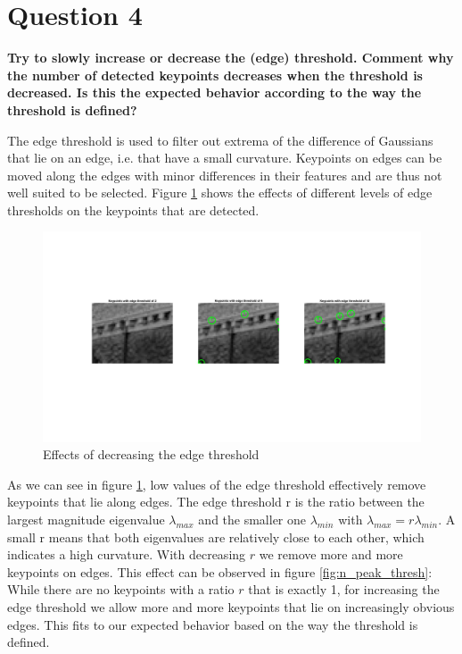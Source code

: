 \section{Question 4}

{\bfseries Try to slowly increase or decrease the (edge) threshold. Comment
why the number of detected keypoints decreases when the threshold is decreased.
Is this the expected behavior according to the way the threshold is defined?}

The edge threshold is used to filter out extrema of the difference of Gaussians that lie on an edge, i.e. that have a small curvature. Keypoints on edges can be moved along the edges with minor differences in their features and are thus not well suited to be selected. Figure \ref{fig:inc_edge_thresh} shows the effects of different levels of edge thresholds on the keypoints that are detected.

\begin{figure}[!hbt]
  \includegraphics[width=\textwidth]{img/inc_edge_thresh}
  \caption{Effects of decreasing the edge threshold}
  \label{fig:inc_edge_thresh}
\end{figure}

As we can see in figure \ref{fig:inc_edge_thresh}, low values of the edge threshold effectively remove keypoints that lie along edges. The edge threshold r is the ratio between the largest magnitude eigenvalue $ \lambda_{max} $ and the smaller one $ \lambda_{min} $ with $ \lambda_{max} = r \lambda_{min} $. A small r means that both eigenvalues are relatively close to each other, which indicates a high curvature. With decreasing $ r $ we remove more and more keypoints on edges. This effect can be observed in figure \ref{fig:n_peak_thresh}: While there are no keypoints with a ratio $ r $ that is exactly 1, for increasing the edge threshold we allow more and more keypoints that lie on increasingly obvious edges. This fits to our expected behavior based on the way the threshold is defined. 

